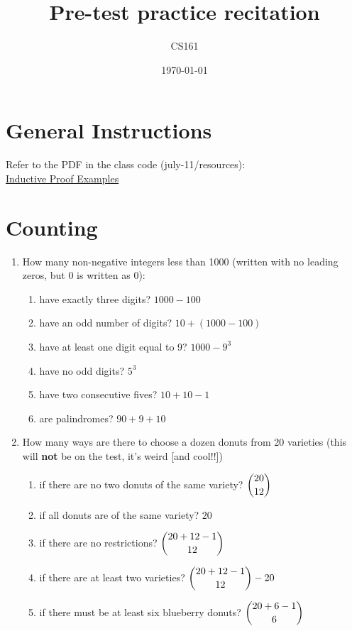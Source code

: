 \documentclass{article}
\title{Pre-test practice recitation}
\date{\today}
\author{CS161}
\begin{document}
\maketitle


\section{General Instructions}
Refer to the PDF in the class code (july-11/resources): \\
\href{https://github.com/csu161/Class-code/blob/master/july-11/resources/inductive-proof-examples.pdf}{Inductive Proof Examples}


\section{Counting}
\begin{enumerate}
\item How many non-negative integers less than 1000 (written with no leading zeros, but 0 is written as 0):
  \begin{enumerate}
  \item have exactly three digits? $1000 - 100$
  \item have an odd number of digits? $10 + (1000 - 100)$
  \item have at least one digit equal to 9? $1000 - 9^3$
  \item have no odd digits? $5^3$
  \item have two consecutive fives? $10 + 10 - 1$
  \item are palindromes? $90 + 9 + 10$
  \end{enumerate}

\item How many ways are there to choose a dozen donuts from 20 varieties (this will \textbf{not} be on the test, it's weird [and cool!!])
  \begin{enumerate}
  \item if there are no two donuts of the same variety? $ \dbinom{20}{12} $
  \item if all donuts are of the same variety? $ 20 $
  \item if there are no restrictions? $ \dbinom{20 + 12 - 1}{12} $
  \item if there are at least two varieties? $ \dbinom{20 + 12 - 1}{12} - 20 $
  \item if there must be at least six blueberry donuts? $ \dbinom{20 + 6 - 1}{6} $
  \end{enumerate}


\end{enumerate}
\end{document}
